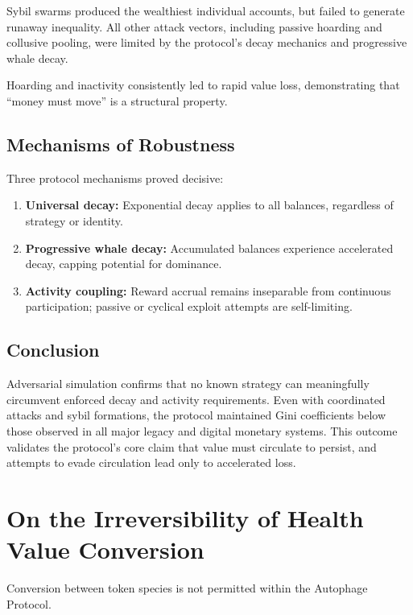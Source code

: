 \documentclass[11pt,letterpaper]{article}
\begin{document}
Sybil swarms produced the wealthiest individual accounts, but failed to generate runaway inequality. All other attack vectors, including passive hoarding and collusive pooling, were limited by the protocol's decay mechanics and progressive whale decay.

Hoarding and inactivity consistently led to rapid value loss, demonstrating that ``money must move'' is a structural property.

\subsection*{Mechanisms of Robustness}

Three protocol mechanisms proved decisive:

\begin{enumerate}
    \item \textbf{Universal decay:} Exponential decay applies to all balances, regardless of strategy or identity.
    \item \textbf{Progressive whale decay:} Accumulated balances experience accelerated decay, capping potential for dominance.
    \item \textbf{Activity coupling:} Reward accrual remains inseparable from continuous participation; passive or cyclical exploit attempts are self-limiting.
\end{enumerate}

\subsection*{Conclusion}

Adversarial simulation confirms that no known strategy can meaningfully circumvent enforced decay and activity requirements. Even with coordinated attacks and sybil formations, the protocol maintained Gini coefficients below those observed in all major legacy and digital monetary systems. This outcome validates the protocol's core claim that value must circulate to persist, and attempts to evade circulation lead only to accelerated loss.

\section{On the Irreversibility of Health Value Conversion}

Conversion between token species is not permitted within the Autophage Protocol.
\end{document}

